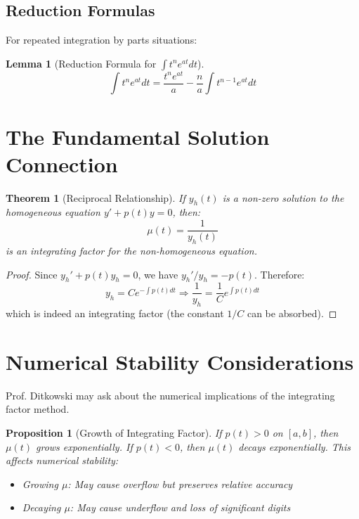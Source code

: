 \documentclass[12pt]{article}
\newtheorem{theorem}{Theorem}
\newtheorem{lemma}{Lemma}
\newtheorem{proposition}{Proposition}
\begin{document}
\subsection{Reduction Formulas}

For repeated integration by parts situations:

\begin{lemma}[Reduction Formula for $\int t^n e^{at}dt$]
\begin{equation}
\int t^n e^{at}dt = \frac{t^n e^{at}}{a} - \frac{n}{a}\int t^{n-1}e^{at}dt
\end{equation}
\end{lemma}

\section{The Fundamental Solution Connection}

\begin{theorem}[Reciprocal Relationship]
If $y_h(t)$ is a non-zero solution to the homogeneous equation $y' + p(t)y = 0$, then:
\begin{equation}
\mu(t) = \frac{1}{y_h(t)}
\end{equation}
is an integrating factor for the non-homogeneous equation.
\end{theorem}

\begin{proof}
Since $y_h' + p(t)y_h = 0$, we have $y_h'/y_h = -p(t)$. Therefore:
\begin{equation}
y_h = Ce^{-\int p(t)dt} \Rightarrow \frac{1}{y_h} = \frac{1}{C}e^{\int p(t)dt}
\end{equation}
which is indeed an integrating factor (the constant $1/C$ can be absorbed).
\end{proof}

\section{Numerical Stability Considerations}

\begin{examtip}
Prof. Ditkowski may ask about the numerical implications of the integrating factor method.
\end{examtip}

\begin{proposition}[Growth of Integrating Factor]
If $p(t) > 0$ on $[a,b]$, then $\mu(t)$ grows exponentially. If $p(t) < 0$, then $\mu(t)$ decays exponentially. This affects numerical stability:
\begin{itemize}
\item Growing $\mu$: May cause overflow but preserves relative accuracy
\item Decaying $\mu$: May cause underflow and loss of significant digits
\end{itemize}
\end{proposition}
\end{document}
